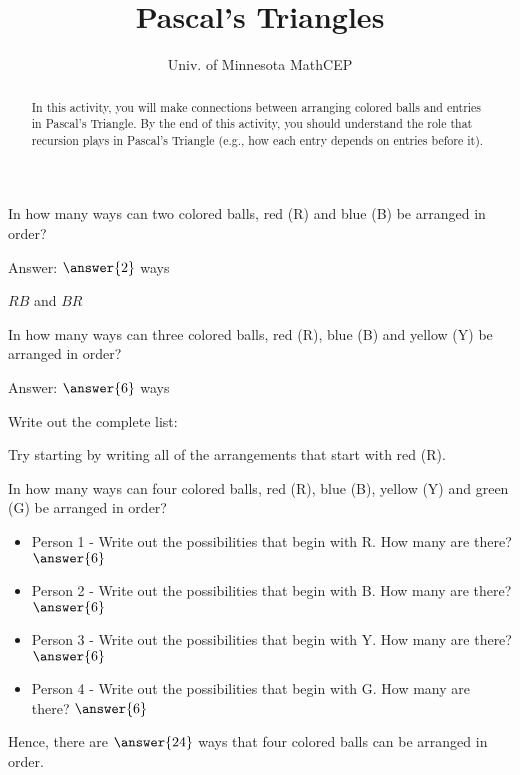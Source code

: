 \documentclass[number]{ximera}
\title{Pascal's Triangles}
\author{Univ. of Minnesota MathCEP}
\begin{document}
\begin{abstract}
In this activity, you will make connections between arranging colored balls and entries in Pascal's Triangle.
By the end of this activity, you should understand the role that recursion plays in Pascal's Triangle (e.g., how each entry depends on entries before it).
\end{abstract}

\maketitle

\begin{question}
In how many ways can two colored balls, red (R) and blue (B) be arranged in order?

Answer: $\answer{2}$ ways
\begin{hint}
$RB$ and $BR$
\end{hint}
\end{question}

\begin{question}
In how many ways can three colored balls, red (R), blue (B) and yellow (Y) be arranged in order? 

Answer: $\answer{6}$ ways

Write out the complete list:
\begin{freeResponse}
\end{freeResponse}
\begin{hint}
Try starting by writing all of the arrangements that start with red (R).
\end{hint}
\end{question}

\begin{question}
In how many ways can four colored balls, red (R), blue (B), yellow (Y) and green (G) be arranged in order?
\begin{itemize}
\item Person 1 - Write out the possibilities that begin with R. How many are there? $\answer{6}$
\item Person 2 - Write out the possibilities that begin with B. How many are there? $\answer{6}$
\item Person 3 - Write out the possibilities that begin with Y. How many are there? $\answer{6}$
\item Person 4 - Write out the possibilities that begin with G. How many are there? $\answer{6}$
\end{itemize}
Hence, there are $\answer{24}$ ways that four colored balls can be arranged in order.
\end{question}
\end{document}
